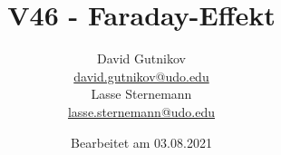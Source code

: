 

\title{V46 - Faraday-Effekt}
\author{
  David Gutnikov\\
  \href{mailto:david.gutnikov@udo.edu}{david.gutnikov@udo.edu}\\
  Lasse Sternemann\\
  \href{mailto:lasse.sternemann@udo.edu}{lasse.sternemann@udo.edu}
}
\date{Bearbeitet am 03.08.2021}


    \maketitle
    \newpage
    \tableofcontents
    \newpage

    
    

    \newpage
    \printbibliography

